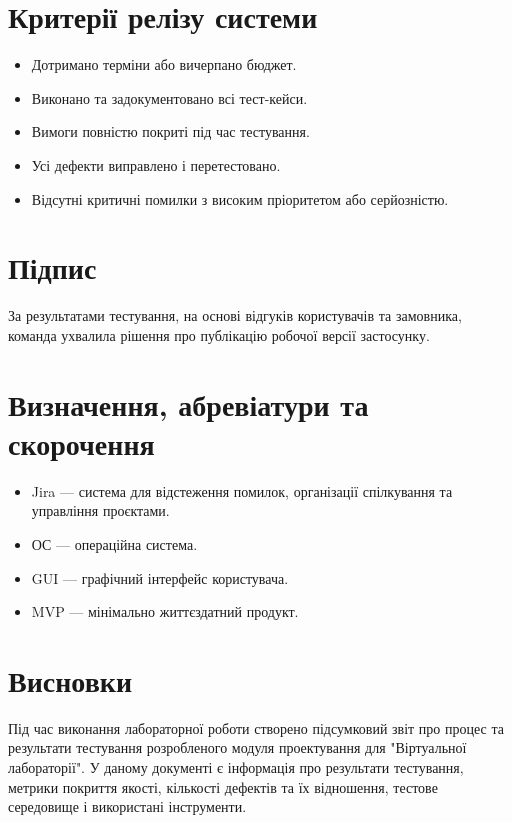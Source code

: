 \documentclass[oneside,14pt]{extarticle}
\begin{document}
\begin{normalsize}
	\section{Критерії релізу системи}
	\begin{itemize}
		\item Дотримано терміни або вичерпано бюджет.
		\item Виконано та задокументовано всі тест-кейси.
		\item Вимоги повністю покриті під час тестування.
		\item Усі дефекти виправлено і перетестовано.
		\item Відсутні критичні помилки з високим пріоритетом або серйозністю.
	\end{itemize}
	
	\section{Підпис}
	За результатами тестування, на основі відгуків користувачів та замовника, команда ухвалила рішення про публікацію робочої версії застосунку.
	
	\section{Визначення, абревіатури та скорочення}
	\begin{itemize}
		\item Jira — система для відстеження помилок, організації спілкування та управління проєктами.
		\item ОС — операційна система.
		\item GUI — графічний інтерфейс користувача.
		\item MVP — мінімально життєздатний продукт.
	\end{itemize}
	
	\section*{Висновки}
	Під час виконання лабораторної роботи створено підсумковий звіт про процес та результати тестування розробленого модуля проектування для "Віртуальної лабораторії". У даному документі є інформація про результати тестування, метрики покриття якості, кількості дефектів та їх відношення, тестове середовище і використані інструменти. 
	    
	\clearpage

\end{normalsize}
\end{document}
